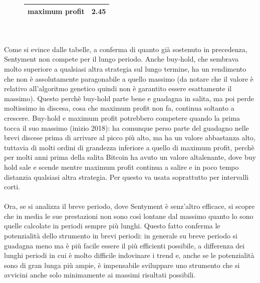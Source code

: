 \documentclass[a4paper,12pt]{report}
\begin{document}
\begin{fig}
\begin{fig}
\begin{subfigure}{\linewidth}
\begin{tabular}{||c c ||}
			\hline
			maximum profit & 2.45 \\ [1ex]
			\hline\hline
		\end{tabular}
	\end{subfigure}
	\label{Tabella 5}
\end{fig}
\\~\\ Come si evince dalle tabelle, a conferma di quanto già sostenuto in precedenza, Sentyment non compete per il lungo periodo. Anche buy-hold, che sembrava molto superiore a qualsiasi altra strategia sul lungo termine, ha un rendimento che non è assolutamente paragonabile a quello massimo (da notare che il valore è relativo all'algoritmo genetico quindi non è garantito essere esattamente il massimo). Questo perchè buy-hold parte bene e guadagna in salita, ma poi perde moltissimo in discesa, cosa che maximum profit non fa, continua soltanto a crescere. Buy-hold e maximum profit potrebbero competere quando la prima tocca il suo massimo (inizio 2018): ha comunque perso parte del guadagno nelle brevi discese prima di arrivare al picco più alto, ma ha un valore abbastanza alto, tuttavia di molti ordini di grandezza inferiore a quello di maximum profit, perchè per molti anni prima della salita Bitcoin ha avuto un valore altalenante, dove buy hold sale e scende mentre maximum profit continua a salire e in poco tempo distanzia qualsiasi altra strategia. Per questo va usata soprattutto per intervalli corti.
\\~\\ Ora, se si analizza il breve periodo, dove Sentyment è senz'altro efficace, si scopre che in media le sue prestazioni non sono così lontane dal massimo quanto lo sono quelle calcolate in periodi sempre più lunghi. Questo fatto conferma le potenzialità dello strumento in brevi periodi: in generale su breve periodo si guadagna meno ma è più facile essere il più efficienti possibile, a differenza dei lunghi periodi in cui è molto difficile indovinare i trend e, anche se le potenzialità sono di gran lunga più ampie, è impensabile sviluppare uno strumento che si avvicini anche solo minimamente ai massimi risultati possibili.\\~\\

\end{fig}
\end{document}

